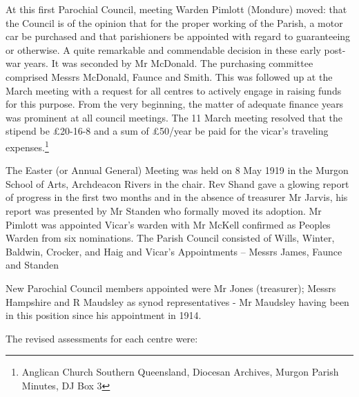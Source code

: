 At this first Parochial Council, meeting Warden Pimlott (Mondure) moved: that the Council is of the opinion that for the proper working of the Parish, a motor car be purchased and that parishioners be appointed with regard to guaranteeing or otherwise. A quite remarkable and commendable decision in these early post-war years. It was seconded by Mr McDonald. The purchasing committee comprised Messrs McDonald, Faunce and Smith. This was followed up at the March meeting with a request for all centres to actively engage in raising funds for this purpose. From the very beginning, the matter of adequate finance years was prominent at all council meetings. The 11 March meeting resolved that the stipend be \pounds20-16-8 and a sum of \pounds50/year be paid for the vicar's traveling expenses.\footnote{Anglican Church Southern Queensland, Diocesan Archives, Murgon Parish Minutes, DJ Box 3}


The Easter (or Annual General) Meeting was held on 8 May 1919 in the Murgon School of Arts, Archdeacon Rivers in the chair. Rev Shand gave a glowing report of progress in the first two months and in the absence of treasurer Mr Jarvis, his report was presented by Mr Standen who formally moved its adoption. Mr Pimlott was appointed Vicar's warden with Mr McKell confirmed as Peoples Warden from six nominations. The Parish Council consisted of Wills, Winter, Baldwin, Crocker, and Haig and Vicar's Appointments -- Messrs James, Faunce and Standen



New Parochial Council members appointed were Mr Jones (treasurer); Messrs Hampshire and R Maudsley as synod representatives - Mr Maudsley having been in this position since his appointment in 1914.



The revised assessments for each centre were:



